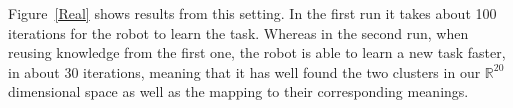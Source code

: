 Figure~\ref{Real} shows results from this setting. In the first run it takes about 100 iterations for the robot to learn the task. Whereas in the second run, when reusing knowledge from the first one, the robot is able to learn a new task faster, in about 30 iterations, meaning that it has well found the two clusters in our $\mathbb{R}^{20}$ dimensional space as well as the mapping to their corresponding meanings.

